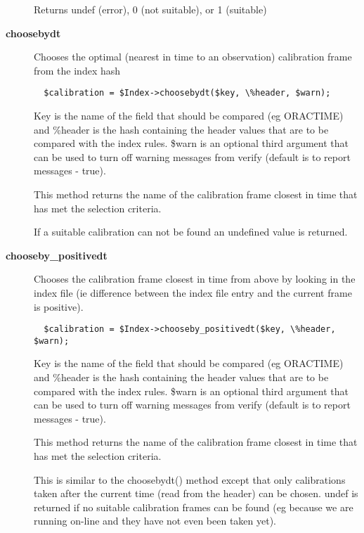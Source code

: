\begin{description}
Returns undef (error), 0 (not suitable), or 1 (suitable)


\item[\textbf{choosebydt}] \mbox{}

Chooses the optimal (nearest in time to an observation) calibration
frame from the index hash

\begin{verbatim}
  $calibration = $Index->choosebydt($key, \%header, $warn);
\end{verbatim}


Key is the name of the field that should be compared (eg ORACTIME)
and \%header is the hash containing the header values that are to
be compared with the index rules. \$warn is an optional third argument
that can be used to turn off warning messages from verify (default
is to report messages - true).



This method returns the name of the calibration frame closest in 
time that has met the selection criteria.



If a suitable calibration can not be found an undefined value is returned.


\item[\textbf{chooseby\_positivedt}] \mbox{}

Chooses the calibration frame closest in time from above by looking 
in the index file (ie difference between the index file entry and
the current frame is positive).

\begin{verbatim}
  $calibration = $Index->chooseby_positivedt($key, \%header, $warn);
\end{verbatim}


Key is the name of the field that should be compared (eg ORACTIME)
and \%header is the hash containing the header values that are to
be compared with the index rules. \$warn is an optional third argument
that can be used to turn off warning messages from verify (default
is to report messages - true).



This method returns the name of the calibration frame closest in 
time that has met the selection criteria.



This is similar to the choosebydt() method except that only
calibrations taken after the current time (read from the
header) can be chosen. undef is returned if no suitable
calibration frames can be found (eg because we are running
on-line and they have not even been taken yet).



\end{description}
